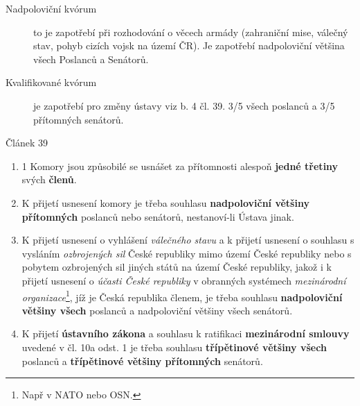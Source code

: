 \documentclass[10pt,a4paper,
twoside,%
]{report}
\newcommand{\ust}[1]{\begin{footnotesize}%
\begin{center}
Článek #1
\end{center}
\end{footnotesize}}%
\begin{document}
\begin{description}
\item[Nadpoloviční kvórum] to je zapotřebí při rozhodování o věcech armády (zahraniční mise, válečný stav, pohyb cizích vojsk na území ČR). Je zapotřebí nadpoloviční většina všech Poslanců a Senátorů.
\item[Kvalifikované kvórum] je zapotřebí pro změny ústavy viz b. 4 čl. 39. 3/5 všech poslanců a 3/5 přítomných senátorů.
\end{description}

\ust{39}\begin{footnotesize}
\begin{enumerate}
\item1 Komory jsou způsobilé se usnášet za přítomnosti alespoň \textbf{jedné třetiny} svých \textbf{členů}.
\item K přijetí usnesení komory je třeba souhlasu\textbf{ nadpoloviční většiny přítomných} poslanců nebo senátorů, nestanoví-li Ústava jinak.
\item K přijetí usnesení o vyhlášení \textit{válečného stavu} a k přijetí usnesení o souhlasu s vysláním \textit{ozbrojených sil} České republiky mimo území České republiky nebo s pobytem ozbrojených sil jiných států na území České republiky, jakož i k přijetí usnesení o \textit{účasti České republiky} v obranných systémech \textit{mezinárodní organizace}\footnote{Např v NATO nebo OSN.}, jíž je Česká republika členem, je třeba souhlasu \textbf{nadpoloviční většiny všech} poslanců a nadpoloviční většiny všech senátorů. 
\item K přijetí \textbf{ústavního zákona} a souhlasu k ratifikaci \textbf{mezinárodní smlouvy} uvedené v čl. 10a odst. 1 je třeba souhlasu \textbf{třípětinové většiny všech} poslanců a \textbf{třípětinové většiny přítomných} senátorů.
\end{enumerate}
\end{footnotesize}
\end{document}
